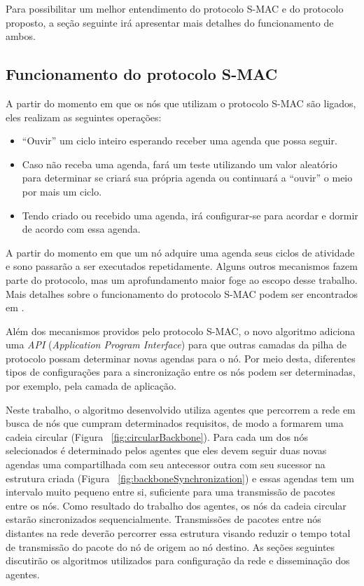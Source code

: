 Para possibilitar um melhor entendimento do protocolo S-MAC e do protocolo proposto, a seção seguinte irá apresentar mais detalhes do funcionamento de ambos.

\subsection{Funcionamento do protocolo S-MAC}

A partir do momento em que os nós que utilizam o protocolo S-MAC são ligados, eles realizam as seguintes operações:

\begin{itemize}
	\item ``Ouvir'' um ciclo inteiro esperando receber uma agenda que possa seguir.
	\item Caso não receba uma agenda, fará um teste utilizando um valor aleatório para determinar se criará sua própria agenda ou continuará a ``ouvir'' o meio por mais um ciclo.
	\item Tendo criado ou recebido uma agenda, irá configurar-se para acordar e dormir de acordo com essa agenda.
\end{itemize}

A partir do momento em que um nó adquire uma agenda seus ciclos de atividade e sono passarão a ser executados repetidamente. Alguns outros mecanismos fazem parte do protocolo, mas um aprofundamento maior foge ao escopo desse trabalho. Mais detalhes sobre o funcionamento do protocolo S-MAC podem ser encontrados em  \citeyear{ye04}. 

Além dos mecanismos providos pelo protocolo S-MAC, o novo algoritmo adiciona uma \emph{API} (\emph{Application Program Interface}) para que outras camadas da pilha de protocolo possam determinar novas agendas para o nó. Por meio desta, diferentes tipos de configurações para a sincronização entre os nós podem ser determinadas, por exemplo, pela camada de aplicação.

Neste trabalho, o algoritmo desenvolvido utiliza agentes que percorrem a rede em busca de nós que cumpram determinados requisitos, de modo a formarem uma cadeia circular (Figura ~\ref{fig:circularBackbone}). Para cada um dos nós selecionados é determinado pelos agentes que eles devem seguir duas novas agendas uma compartilhada com seu antecessor outra com seu sucessor na estrutura criada (Figura ~\ref{fig:backboneSynchronization}) e essas agendas tem um intervalo muito pequeno entre si, suficiente para uma transmissão de pacotes entre os nós. Como resultado do trabalho dos agentes, os nós da cadeia circular estarão sincronizados sequencialmente. Transmissões de pacotes entre nós distantes na rede deverão percorrer essa estrutura visando reduzir o tempo total de transmissão do pacote do nó de origem ao nó destino. As seções seguintes discutirão os algoritmos utilizados para configuração da rede e disseminação dos agentes.

